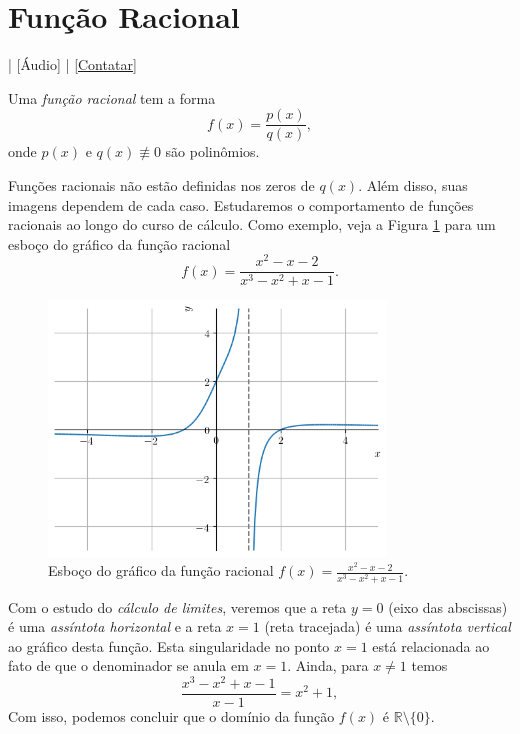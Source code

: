 \section{Função Racional}\label{cap_funcao_sec_funracio}

\begin{flushright}
  [Vídeo] | [Áudio] | \href{https://phkonzen.github.io/notas/contato.html}{[Contatar]}
\end{flushright}

Uma \emph{função racional} tem a forma
\begin{equation}
  f(x) = \frac{p(x)}{q(x)},
\end{equation}
onde $p(x)$ e $q(x)\not\equiv 0$ são polinômios.

Funções racionais não estão definidas nos zeros de $q(x)$. Além disso, suas imagens dependem de cada caso. Estudaremos o comportamento de funções racionais ao longo do curso de cálculo. Como exemplo, veja a Figura \ref{fig:racional_grafico} para um esboço do gráfico da função racional
\begin{equation}
  f(x) = \frac{x^2-x-2}{x^3-x^2+x-1}.
\end{equation}

\begin{figure}[H]
  \centering
  \includegraphics[width=0.8\textwidth]{./cap_funcao/dados/fig_racional_grafico/fig_racional_grafico}
  \caption{Esboço do gráfico da função racional $\displaystyle f(x) = \frac{x^{2} - x - 2}{x^{3} - x^{2} + x - 1}$.}
  \label{fig:racional_grafico}
\end{figure}

Com o estudo do \emph{cálculo de limites}, veremos que a reta $y = 0$ (eixo das abscissas) é uma \emph{assíntota horizontal} e a reta $x=1$ (reta tracejada) é uma \emph{assíntota vertical} ao gráfico desta função. Esta singularidade no ponto $x=1$ está relacionada ao fato de que o denominador se anula em $x=1$. Ainda, para $x\neq 1$ temos
\begin{equation}
  \frac{x^3 - x^2 + x - 1}{x-1} = x^2 + 1,
\end{equation}
Com isso, podemos concluir que o domínio da função $f(x)$ é $\mathbb{R}\setminus\{0\}$.


